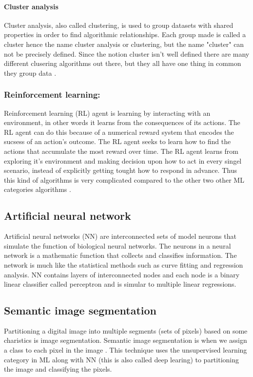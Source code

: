 \documentclass[conference]{IEEEtran}
\begin{document}
			\paragraph{Cluster analysis}
			Cluster analysis, also called clustering, is used to group datasets with shared properties in order to find algorithmic relationships. Each group made is
			called a cluster hence the name cluster analysis or clustering, but the name "cluster" can not be precisely defined. Since the notion cluster isn't well defined
			there are many different clusering algorithms out there, but they all have one thing in common they group data \cite{Wiki:CA}.

		\subsubsection{Reinforcement learning:}
			Reinforcement learning (RL) agent is learning by interacting with an environment, in other words it learns from the consequences of its actions. The RL agent can
			do this because of a numerical reward system that encodes the sucsess of an action's outcome. The RL agent seeks to learn how to find the actions that accumulate the
			most reward over time. The RL agent learns from exploring it's environment and making decision upon how to act in every singel scenario, instead of explicitly getting tought
			how to respond in advance. Thus this kind of algorithms is very complicated compared to the other two other ML categories algorithms \cite{Scholar:RL}.
	
	\subsection{Artificial neural network}
		Artificial neural networks (NN) are interconnected sets of model neurons that simulate the function of biological neural networks.
		The neurons in a neural network is a mathematic function that collects and classifies information. The network is much like the 
		statistical methods such as curve fitting and regression analysis. NN contains layers of interconnected nodes and each node 
		is a binary linear classifier called perceptron and is simular to multiple linear regressions. \cite{pedia:NN}

	\subsection{Semantic image segmentation}
		Partitioning a digital image into multiple segments (sets of pixels) based on some charistics is image segmentation. Semantic image segmentation is when we assign a class to each 
		pixel in the image \cite{towardsDataSience:SIS}. This technique uses the unsupervised learning category in ML along with NN (this is also called deep learing) to partitioning the image 
		and classifying the pixels. 
\end{document}
